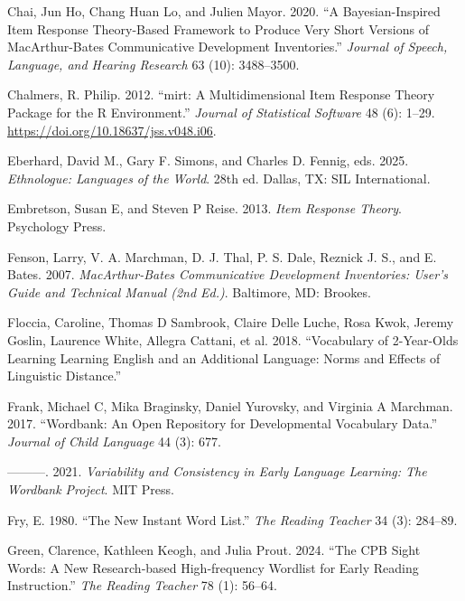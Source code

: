 \documentclass[
  letterpaper,
  DIV=11,
  numbers=noendperiod]{scrartcl}
\newlength{\cslhangindent}
\newenvironment{CSLReferences}[2] %
 {\begin{list}{}{%
  \setlength{\itemindent}{0pt}
  \setlength{\leftmargin}{0pt}
  \setlength{\parsep}{0pt}
  \ifodd #1
   \setlength{\leftmargin}{\cslhangindent}
   \setlength{\itemindent}{-1\cslhangindent}
  \fi
  \setlength{\itemsep}{#2\baselineskip}}}
 {\end{list}}
\begin{document}
\begin{CSLReferences}{1}{0}
Chai, Jun Ho, Chang Huan Lo, and Julien Mayor. 2020. {``A
{B}ayesian-Inspired Item Response Theory-Based Framework to Produce Very
Short Versions of {M}ac{A}rthur-{B}ates {C}ommunicative {D}evelopment
{I}nventories.''} \emph{Journal of Speech, Language, and Hearing
Research} 63 (10): 3488--3500.

Chalmers, R. Philip. 2012. {``{mirt}: A Multidimensional Item Response
Theory Package for the {R} Environment.''} \emph{Journal of Statistical
Software} 48 (6): 1--29. \url{https://doi.org/10.18637/jss.v048.i06}.

Eberhard, David M., Gary F. Simons, and Charles D. Fennig, eds. 2025.
\emph{Ethnologue: Languages of the World}. 28th ed. Dallas, TX: SIL
International.

Embretson, Susan E, and Steven P Reise. 2013. \emph{Item Response
Theory}. Psychology Press.

Fenson, Larry, V. A. Marchman, D. J. Thal, P. S. Dale, Reznick J. S.,
and E. Bates. 2007. \emph{{M}ac{A}rthur-{B}ates {C}ommunicative
{D}evelopment {I}nventories: User's Guide and Technical Manual (2nd
Ed.)}. Baltimore, MD: Brookes.

Floccia, Caroline, Thomas D Sambrook, Claire Delle Luche, Rosa Kwok,
Jeremy Goslin, Laurence White, Allegra Cattani, et al. 2018.
{``Vocabulary of 2-Year-Olds Learning Learning English and an Additional
Language: Norms and Effects of Linguistic Distance.''}

Frank, Michael C, Mika Braginsky, Daniel Yurovsky, and Virginia A
Marchman. 2017. {``Wordbank: An Open Repository for Developmental
Vocabulary Data.''} \emph{Journal of Child Language} 44 (3): 677.

---------. 2021. \emph{Variability and Consistency in Early Language
Learning: The {Wordbank} Project}. MIT Press.

Fry, E. 1980. {``The New Instant Word List.''} \emph{The Reading
Teacher} 34 (3): 284--89.

Green, Clarence, Kathleen Keogh, and Julia Prout. 2024. {``The {CPB}
Sight Words: A New Research‐based High‐frequency Wordlist for Early
Reading Instruction.''} \emph{The Reading Teacher} 78 (1): 56--64.


\end{CSLReferences}
\end{document}

